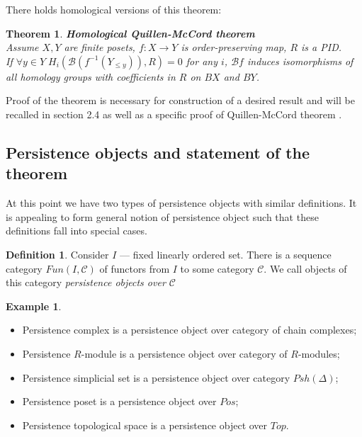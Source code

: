 \documentclass[a4paper, 12pt]{article}
\newtheorem{theorem}{Theorem}
\theoremstyle{definition}
\newtheorem{definition}{Definition}
\newtheorem{example}{Example}
\theoremstyle{remark}
\newcommand{\define}[1]{{\textit{#1}}}
\begin{document}
There holds homological {\cite[Corollary 5.5]{Bar11}} versions of this theorem:

\begin{theorem} \textbf{Homological Quillen-McCord theorem}\\
  Assume $X, Y$ are finite posets, $f : X \to Y$ is order-preserving map, $R$ is a PID.\\
  If $\forall y \in Y\;H_i(\mathcal{B}(f^{-1}(Y_{\leqslant y})),R) = 0$ for any $i$, $\mathcal{B}f$ induces isomorphisms of all homology groups with coefficients in $R$ on $BX$ and $BY$.\\
\end{theorem}

Proof of the theorem is necessary for construction of a desired result and will be recalled in section 2.4 as well as a specific proof of Quillen-McCord theorem {\cite[Proof of Theorem 1.1]{Bar11}}.\\

\subsection{Persistence objects and statement of the theorem}

At this point we have two types of persistence objects with similar definitions. It is appealing to form general notion of persistence object such that these definitions fall into special cases.\\

\begin{definition}
  Consider $I$ --- fixed linearly ordered set. There is a sequence category $Fun(I, \mathcal{C})$ of functors from $I$ to some category $\mathcal{C}$. We call objects of this category \define{persistence objects over $\mathcal{C}$}
\end{definition}

\begin{example} ~ \par
  \begin{itemize}
    \item Persistence complex is a persistence object over category of chain complexes;
    \item Persistence $R$-module is a persistence object over category of $R$-modules;
    \item Persistence simplicial set is a persistence object over category $Psh(\Delta)$;
    \item Persistence poset is a persistence object over $Pos$;
    \item Persistence topological space is a persistence object over $Top$.
  \end{itemize}
\end{example}
\end{document}

